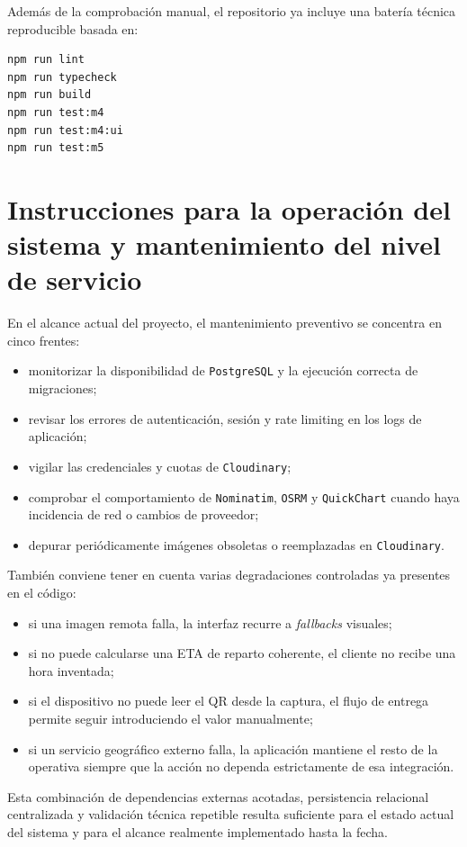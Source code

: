 Además de la comprobación manual, el repositorio ya incluye una batería técnica reproducible basada en:

\begin{lstlisting}[language=bash]
npm run lint
npm run typecheck
npm run build
npm run test:m4
npm run test:m4:ui
npm run test:m5
\end{lstlisting}

\section{Instrucciones para la operación del sistema y mantenimiento del nivel de servicio}

En el alcance actual del proyecto, el mantenimiento preventivo se concentra en cinco frentes:

\begin{itemize}
    \item monitorizar la disponibilidad de \texttt{PostgreSQL} y la ejecución correcta de migraciones;
    \item revisar los errores de autenticación, sesión y rate limiting en los logs de aplicación;
    \item vigilar las credenciales y cuotas de \texttt{Cloudinary};
    \item comprobar el comportamiento de \texttt{Nominatim}, \texttt{OSRM} y \texttt{QuickChart} cuando haya incidencia de red o cambios de proveedor;
    \item depurar periódicamente imágenes obsoletas o reemplazadas en \texttt{Cloudinary}.
\end{itemize}

También conviene tener en cuenta varias degradaciones controladas ya presentes en el código:

\begin{itemize}
    \item si una imagen remota falla, la interfaz recurre a \textit{fallbacks} visuales;
    \item si no puede calcularse una ETA de reparto coherente, el cliente no recibe una hora inventada;
    \item si el dispositivo no puede leer el QR desde la captura, el flujo de entrega permite seguir introduciendo el valor manualmente;
    \item si un servicio geográfico externo falla, la aplicación mantiene el resto de la operativa siempre que la acción no dependa estrictamente de esa integración.
\end{itemize}

Esta combinación de dependencias externas acotadas, persistencia relacional centralizada y validación técnica repetible resulta suficiente para el estado actual del sistema y para el alcance realmente implementado hasta la fecha.
